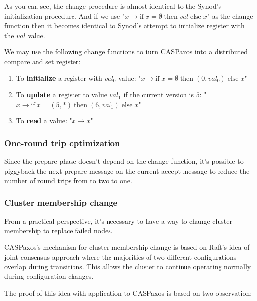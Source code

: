 \documentclass[12pt]{article}
\begin{document}
As you can see, the change procedure is almost identical to the Synod's initialization procedure. And if we use "$x \to \mbox{if}\; x = \emptyset \;\mbox{then}\; val\; \mbox{else}\; x$" as the change function then it becomes identical to Synod's attempt to initialize register with the $val$ value.

We may use the following change functions to turn CASPaxos into a distributed compare and set register:
\begin{enumerate}
  \item To {\bf initialize} a register with $val_0$ value: "$x \to \mbox{if}\; x = \emptyset \;\mbox{then}\; (0, val_0)\; \mbox{else}\; x$"
  \item To {\bf update} a register to value $val_1$ if the current version is $5$: "$x \to \mbox{if}\; x = (5, \ast) \;\mbox{then}\; (6, val_1)\; \mbox{else}\; x$"
  \item To {\bf read} a value: "$x \to x$"
\end{enumerate}

\subsubsection{One-round trip optimization}

Since the prepare phase doesn't depend on the change function, it's possible to piggyback the next prepare message on the current accept message to reduce the number of round trips from to two to one.

\subsubsection{Cluster membership change}

From a practical perspective, it's necessary to have a way to change cluster membership to replace failed nodes. 

CASPaxos’s mechanism for cluster membership change is based on Raft's idea of joint consensus\cite{raft} approach where the majorities of two different configurations overlap during transitions. This allows the cluster to continue operating normally during configuration changes.

The proof of this idea with application to CASPaxos is based on two observation:
\end{document}
